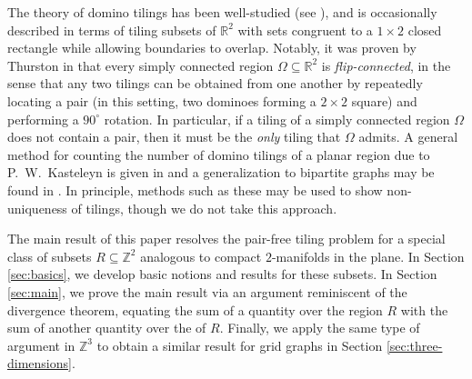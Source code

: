 The theory of domino tilings has been well-studied (see \cite{saldanha1995}), and is occasionally described in terms of tiling subsets of $\mathbb{R}^2$ with sets congruent to a $1 \times 2$ closed rectangle while allowing boundaries to overlap. 
Notably, it was proven by Thurston in \cite{thurston1990} that every simply connected region $\Omega \subseteq \mathbb{R}^2$ is \emph{flip-connected}, in the sense that any two tilings can be obtained from one another by repeatedly locating a pair (in this setting, two dominoes forming a $2 \times 2$ square) and performing a $90^\circ$ rotation.
In particular, if a tiling of a simply connected region $\Omega$ does not contain a pair, then it must be the 
\emph{only} tiling that $\Omega$ admits.
A general method for counting the number of domino tilings of a planar region due to P.~W.~Kasteleyn is given in \cite{kasteleyn1961} and a generalization to bipartite graphs may be found in \cite{lieb1993}.
In principle, methods such as these may be used to show non-uniqueness of tilings, though we do not take this approach.

The main result of this paper resolves the pair-free tiling problem for a special class of subsets $R \subseteq \mathbb{Z}^2$ analogous to compact $2$-manifolds in the plane. 
In Section \ref{sec:basics}, we develop basic notions and results for these subsets.
In Section \ref{sec:main}, we prove the main result via an argument reminiscent of the divergence theorem, equating the sum of a quantity over the region $R$ with the sum of another quantity over the  of $R$.
Finally, we apply the same type of argument in $\mathbb{Z}^3$ to obtain a similar result for grid graphs in Section \ref{sec:three-dimensions}.

